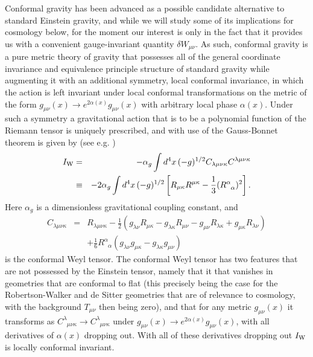 Conformal gravity has been advanced \cite{mannheim_kazanas_1989,mannheim_kazanas_1994,mannheim_2006,mannheim_2012,mannheim_2017} as a possible candidate alternative to standard Einstein gravity, and while we will study some of its implications for cosmology below, for the moment our interest is only in the fact that it provides us with a convenient gauge-invariant quantity $\delta W_{\mu\nu}$. As such, conformal gravity is a pure metric theory of gravity that possesses all of the general coordinate invariance and equivalence principle structure of standard gravity while augmenting it with an additional symmetry, local conformal invariance, in which  the action is left invariant under local conformal transformations on the metric of the form $g_{\mu\nu}(x)\rightarrow e^{2\alpha(x)}g_{\mu\nu}(x)$ with arbitrary local phase $\alpha(x)$. Under such a symmetry a gravitational action that is to be a polynomial function of the Riemann tensor is uniquely prescribed, and with use of the Gauss-Bonnet theorem is given by (see e.g. \cite{mannheim_2006}) 
%
\begin{eqnarray}
I_{\rm W}&=&-\alpha_g\int d^4x\, (-g)^{1/2}C_{\lambda\mu\nu\kappa}
C^{\lambda\mu\nu\kappa}
\nonumber\\
&\equiv& -2\alpha_g\int d^4x\, (-g)^{1/2}\left[R_{\mu\kappa}R^{\mu\kappa}-\frac{1}{3} (R^{\alpha}_{\phantom{\alpha}\alpha})^2\right].
\label{4.1}
\end{eqnarray}
% 
Here $\alpha_g$ is a dimensionless  gravitational coupling constant, and
%
\begin{eqnarray}
C_{\lambda\mu\nu\kappa}&=& R_{\lambda\mu\nu\kappa}
-\frac{1}{2}\left(g_{\lambda\nu}R_{\mu\kappa}-
g_{\lambda\kappa}R_{\mu\nu}-
g_{\mu\nu}R_{\lambda\kappa}+
g_{\mu\kappa}R_{\lambda\nu}\right)
\nonumber\\
&&+\frac{1}{6}R^{\alpha}_{\phantom{\alpha}\alpha}\left(
g_{\lambda\nu}g_{\mu\kappa}-
g_{\lambda\kappa}g_{\mu\nu}\right)
\label{4.2}
\end{eqnarray}
% 
is the conformal Weyl tensor. The conformal Weyl tensor has two features that are not possessed by the Einstein tensor, namely that it that vanishes in geometries that are conformal to flat (this precisely being the case for  the Robertson-Walker and de Sitter geometries that are of relevance to cosmology, with the background $T_{\mu\nu}$ then being zero),  and that for any metric $g_{\mu\nu}(x)$ it transforms as  $C^{\lambda}_{\phantom{\lambda}\mu\nu\kappa} \rightarrow  C^{\lambda}_{\phantom{\lambda}\mu\nu\kappa}$ under $g_{\mu\nu}(x)\rightarrow e^{2\alpha(x)}g_{\mu\nu}(x)$, with all derivatives of $\alpha(x)$ dropping out. With all of these derivatives dropping out $I_{\rm W}$ is locally conformal invariant.

